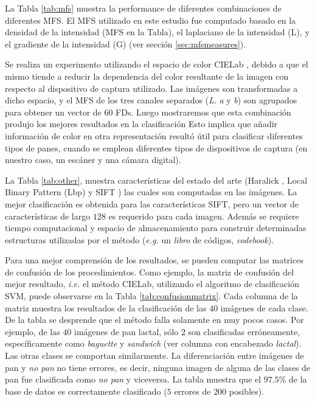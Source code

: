 La Tabla \ref{tab:mfs} muestra la performance de diferentes combinaciones de diferentes MFS.
El MFS utilizado en este estudio fue computado basado en la densidad de la intensidad (MFS en la Tabla), el laplaciano de la intensidad (L), y el gradiente de la intensidad (G) (ver sección \ref{sec:mfsmeasures}).

Se realiza un experimento utilizando el espacio de color CIELab \cite{Hunter58}, debido a que el mismo tiende a reducir la dependencia del color resultante de la imagen con respecto al dispositivo de captura utilizado.
Las imágenes son transformadas a dicho espacio, y el MFS de los tres canales separados ({\em L}. {\em a} y {\em b}) son agrupados para obtener un vector de $60$ FDs.
Luego mostraremos que esta combinación produjo los mejores resultados en la clasificación
Esto implica que añadir información de color en otra representación resultó útil para clasificar diferentes tipos de panes, cuando se emplean diferentes tipos de dispositivos de captura (en nuestro caso, un escáner y una cámara digital).

La Tabla \ref{tab:other}, muestra características del estado del arte (Haralick \cite{Haralick73}, Local Binary Pattern (Lbp) \cite{Ojala96} y SIFT \cite{Lowe2004}) las cuales son computadas en las imágenes.
La mejor clasificación es obtenida para las características SIFT, pero un vector de características de largo $128$ es requerido para cada imagen.
Además se requiere tiempo computacional y espacio de almacenamiento para construir determinadas estructuras utilizadas por el método ({\em e.g.} un {\em libro} de códigos, {\em codebook}).


Para una mejor comprensión de los resultados, se pueden computar las matrices de confusión de los procedimientos.
Como ejemplo, la matriz de confusión del mejor resultado, {\em i.e.} el método CIELab, utilizando el algoritmo de clasificación SVM, puede observarse en la Tabla \ref{tab:confusionmatrix}.
Cada columna de la matriz muestra los resultados de la clasificación de las $40$ imágenes de cada clase.
De la tabla se desprende que el método falla solamente en muy pocos casos.
Por ejemplo, de las $40$ imágenes de pan lactal, sólo $2$ son clasificadas erróneamente, específicamente como {\em baguette} y {\em sandwich} (ver columna con encabezado {\em lactal}).
Las otras clases se comportan similarmente.
La diferenciación entre imágenes de pan y {\em no pan} no tiene errores, es decir, ninguna imagen de alguna de las clases de pan fue clasificada como {\em no pan} y viceversa.
La tabla muestra que el $97.5\%$ de la base de datos es correctamente clasificado ($5$ errores de $200$ posibles).

